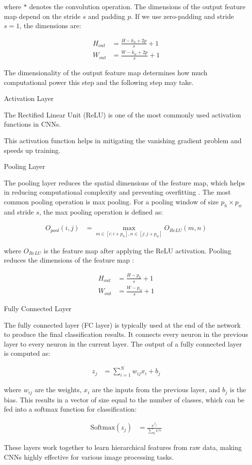 where \( * \) denotes the convolution operation.
The dimensions of the output feature map depend on the stride \( s \) and padding \( p \).
If we use zero-padding and stride \( s = 1 \), the dimensions are:

\begin{align}
  H_{out} &= \frac{H - k_h + 2p}{s} + 1 \\
  W_{out} &= \frac{W - k_w + 2p}{s} + 1
\end{align}

The dimensionality of the output feature map determines how much computational power this step and the following step may take.

Activation Layer 

The Rectified Linear Unit (ReLU) is one of the most commonly used activation functions in CNNs.

This activation function helps in mitigating the vanishing gradient problem and speeds up training.

Pooling Layer

The pooling layer reduces the spatial dimensions of the feature map, which helps in reducing computational complexity and preventing overfitting \cite{Yamaguchi_Sakamoto_Akabane_Fujimoto_1990}.
The most common pooling operation is max pooling.
For a pooling window of size \( p_h \times p_w \) and stride \( s \), the max pooling operation is defined as:

\begin{align}
  O_{pool}(i, j) &= \max_{m \in [i:i+p_h], n \in [j:j+p_w]} O_{ReLU}(m, n)
\end{align}

where \( O_{ReLU} \) is the feature map after applying the ReLU activation.
Pooling reduces the dimensions of the feature map \cite{Ciresan_Meier_Schmidhuber_2012}:

\begin{align}
  H_{out} &= \frac{H - p_h}{s} + 1 \\
  W_{out} &= \frac{W - p_w}{s} + 1
\end{align}

Fully Connected Layer

The fully connected layer (FC layer) is typically used at the end of the network to produce the final classification results.
It connects every neuron in the previous layer to every neuron in the current layer.
The output of a fully connected layer is computed as:

\begin{align}
  z_j &= \sum_{i=1}^{N} w_{ij} x_i + b_j
\end{align}

where \( w_{ij} \) are the weights, \( x_i \) are the inputs from the previous layer, and \( b_j \) is the bias.
This results in a vector of size equal to the number of classes, which can be fed into a softmax function for classification:

\begin{align}
  \text{Softmax}(z_j) &= \frac{e^{z_j}}{\sum_{k} e^{z_k}}
\end{align}

These layers work together to learn hierarchical features from raw data, making CNNs highly effective for various image processing tasks.

